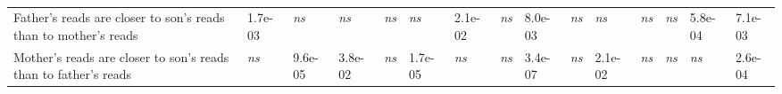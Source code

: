 \begin{samepage}
\begin{table}[h!]
\begin{tabular}{lllllllllllllll}
Father's reads are closer to son's reads than to mother's reads                         & 1.7e-03     & \textit{ns} & \textit{ns} & \textit{ns} & \textit{ns} & 2.1e-02     & \textit{ns} & 8.0e-03     & \textit{ns} & \textit{ns} & \textit{ns} & \textit{ns} & 5.8e-04     & 7.1e-03     \\
Mother's reads are closer to son's reads than to father's reads                         & \textit{ns} & 9.6e-05     & 3.8e-02     & \textit{ns} & 1.7e-05     & \textit{ns} & \textit{ns} & 3.4e-07     & \textit{ns} & 2.1e-02     & \textit{ns} & \textit{ns} & \textit{ns} & 2.6e-04     \\
\hline
\end{tabular}
\caption{}
\label{}
\end{table}
\end{samepage}
